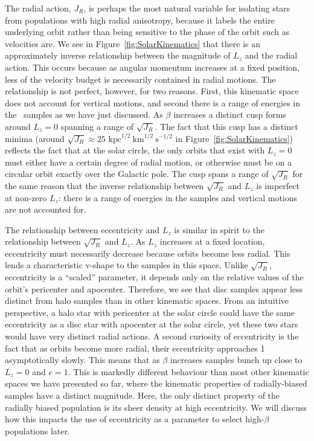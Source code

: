 The radial action, $J_{R}$, is perhaps the most natural variable for isolating stars from populations with high radial anisotropy, because it labels the entire underlying orbit rather than being sensitive to the phase of the orbit such as velocities are. We see in Figure~\ref{fig:SolarKinematics} that there is an approximately inverse relationship between the magnitude of $L_{z}$ and the radial action. This occurs because as angular momentum increases at a fixed position, less of the velocity budget is necessarily contained in radial motions. The relationship is not perfect, however, for two reasons. First, this kinematic space does not account for vertical motions, and second there is a range of energies in the \solar\ samples as we have just discussed. As $\beta$ increases a distinct cusp forms around $L_{z}=0$ spanning a range of $\sqrt{J_{R}}$. The fact that this cusp has a distinct minima (around $\sqrt{J_{R}}\approx25$ $\mathrm{kpc}^{1/2}~\mathrm{km}^{1/2}~\mathrm{s}^{-1/2}$ in Figure~\ref{fig:SolarKinematics}) reflects the fact that at the solar circle, the only orbits that exist with $L_{z}=0$ must either have a certain degree of radial motion, or otherwise must be on a circular orbit exactly over the Galactic pole. The cusp spans a range of $\sqrt{J_{R}}$ for the same reason that the inverse relationship between $\sqrt{J_{R}}$ and $L_{z}$ is imperfect at non-zero $L_{z}$: there is a range of energies in the samples and vertical motions are not accounted for.

The relationship between eccentricity and $L_{z}$ is similar in spirit to the relationship between $\sqrt{J_{R}}$ and $L_{z}$. As $L_{z}$ increases at a fixed location, eccentricity must necessarily decrease because orbits become less radial. This lends a characteristic v-shape to the samples in this space. Unlike $\sqrt{J_{R}}$, eccentricity is a ``scaled'' parameter, it depends only on the relative values of the orbit's pericenter and apocenter. Therefore, we see that disc samples appear less distinct from halo samples than in other kinematic spaces. From an intuitive perspective, a halo star with pericenter at the solar circle could have the same eccentricity as a disc star with apocenter at the solar circle, yet these two stars would have very distinct radial actions. A second curiosity of eccentricity is the fact that as orbits become more radial, their eccentricity approaches 1 asymptotically slowly. This means that as $\beta$ increases samples bunch up close to $L_{z}=0$ and $e=1$. This is markedly different behaviour than most other kinematic spaces we have presented so far, where the kinematic properties of radially-biased samples have a distinct magnitude. Here, the only distinct property of the radially biased population is its sheer density at high eccentricity. We will discuss how this impacts the use of eccentricity as a parameter to select high-$\beta$ populations later.

